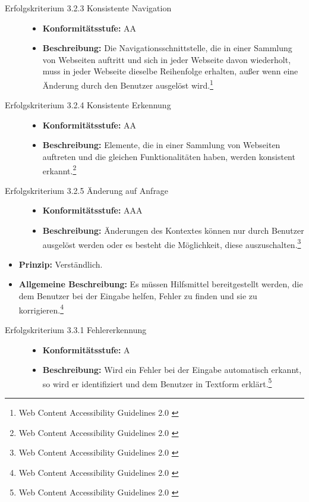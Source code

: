 \begin{description}
\begin{description}
		\item[Erfolgskriterium 3.2.3 Konsistente Navigation]\hfill
		\begin{itemize}
			\item \textbf{Konformitätsstufe:} AA
			\item \textbf{Beschreibung:} Die Navigationsschnittstelle, die in einer Sammlung von Webseiten auftritt und sich in jeder Webseite davon wiederholt, muss in jeder Webseite 
			dieselbe Reihenfolge erhalten, außer wenn eine Änderung durch den Benutzer ausgelöst wird.\footnote{Web Content Accessibility Guidelines 2.0 \cite{WCAG2.0}}
		\end{itemize}
		
		\item[Erfolgskriterium 3.2.4 Konsistente Erkennung]\hfill
		\begin{itemize}
			\item \textbf{Konformitätsstufe:} AA
			\item \textbf{Beschreibung:} Elemente, die in einer Sammlung von Webseiten auftreten und die gleichen Funktionalitäten haben, werden konsistent 
			erkannt.\footnote{Web Content Accessibility Guidelines 2.0 \cite{WCAG2.0}}
		\end{itemize}
		
		\item[Erfolgskriterium 3.2.5 Änderung auf Anfrage]\hfill
		\begin{itemize}
			\item \textbf{Konformitätsstufe:} AAA
			\item \textbf{Beschreibung:} Änderungen des Kontextes können nur durch Benutzer ausgelöst werden oder es besteht die Möglichkeit, diese 
			auszuschalten.\footnote{Web Content Accessibility Guidelines 2.0 \cite{WCAG2.0}}
		\end{itemize}
	\end{description}

	\item[Richtlinie 3.3 Hilfestellung bei der Eingabe]\hfill
	\begin{itemize}
		\item \textbf{Prinzip:} Verständlich.
		\item \textbf{Allgemeine Beschreibung:} Es müssen Hilfsmittel bereitgestellt werden, die dem Benutzer bei der Eingabe helfen, Fehler zu finden und sie zu 
		korrigieren.\footnote{Web Content Accessibility Guidelines 2.0 \cite{WCAG2.0}}
	\end{itemize}
	
	\begin{description}
		\item[Erfolgskriterium 3.3.1 Fehlererkennung]\hfill
		\begin{itemize}
			\item \textbf{Konformitätsstufe:} A
			\item \textbf{Beschreibung:} Wird ein Fehler bei der Eingabe automatisch erkannt, so wird er identifiziert und dem Benutzer in Textform 
			erklärt.\footnote{Web Content Accessibility Guidelines 2.0 \cite{WCAG2.0}}
		\end{itemize}
		

\end{description}
\end{description}
